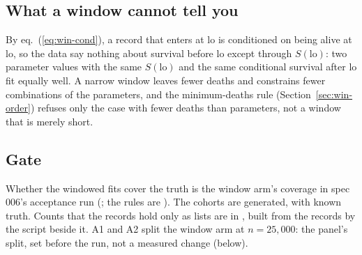 \subsection{What a window cannot tell you}\label{sec:win-limits}

By eq.~(\ref{eq:win-cond}), a record that enters at lo is conditioned on being alive at lo, so the data say nothing about
survival before lo except through $S(\mathrm{lo})$: two parameter values with the same $S(\mathrm{lo})$ and the same
conditional survival after lo fit equally well. A narrow window leaves fewer deaths and constrains fewer combinations of
the parameters, and the minimum-deaths rule (Section~\ref{sec:win-order}) refuses only the case with fewer deaths than
parameters, not a window that is merely short.

\subsection{Gate}\label{sec:win-gate}

Whether the windowed fits cover the truth is the window arm's coverage in spec 006's acceptance run (;
the rules are ). The cohorts are generated, with known truth. Counts that the records
hold only as lists are in , built from the
records by the script beside it. A1 and A2 split the window arm at $n=25{,}000$: the panel's split, set before the run, not
a measured change (below).


